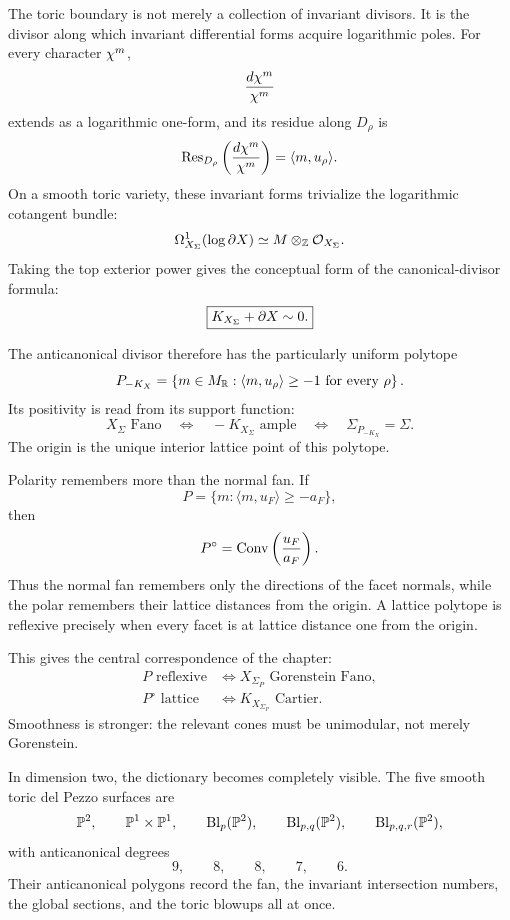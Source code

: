 The toric boundary is not merely a collection of invariant divisors.
It is the divisor along which invariant differential forms acquire
logarithmic poles. For every character \(\character{m}\),
\[
\frac{d\character{m}}{\character{m}}
\]
extends as a logarithmic one-form, and its residue along \(D_\rho\) is
\[
\operatorname{Res}_{D_\rho}
\left(\frac{d\character{m}}{\character{m}}\right)
=
\langle m,u_\rho\rangle.
\]
On a smooth toric variety, these invariant forms trivialize the
logarithmic cotangent bundle:
\[
\Omega^1_{X_\Sigma}(\log\boundaryX)
\simeq
M\otimes_{\ZZ}\mathcal O_{X_\Sigma}.
\]
Taking the top exterior power gives the conceptual form of the
canonical-divisor formula:
\[
\boxed{K_{X_\Sigma}+\boundaryX\sim0.}
\]

The anticanonical divisor therefore has the particularly uniform
polytope
\[
P_{-K_X}
=
\left\{
 m\in M_\RR:
 \langle m,u_\rho\rangle\geq-1
 \text{ for every }\rho
\right\}.
\]
Its positivity is read from its support function:
\[
X_\Sigma\text{ Fano}
\quad\Longleftrightarrow\quad
-K_{X_\Sigma}\text{ ample}
\quad\Longleftrightarrow\quad
\Sigma_{P_{-K_X}}=\Sigma.
\]
The origin is the unique interior lattice point of this polytope.

Polarity remembers more than the normal fan. If
\[
P=\{m:\langle m,u_F\rangle\geq-a_F\},
\]
then
\[
P^\circ
=
\Conv\left(\frac{u_F}{a_F}\right).
\]
Thus the normal fan remembers only the directions of the facet
normals, while the polar remembers their lattice distances from the
origin. A lattice polytope is reflexive precisely when every facet is
at lattice distance one from the origin.

This gives the central correspondence of the chapter:
\[
\boxed{
\begin{aligned}
P\text{ reflexive}
&\Longleftrightarrow
X_{\Sigma_P}\text{ Gorenstein Fano},\\
P^\circ\text{ lattice}
&\Longleftrightarrow
K_{X_{\Sigma_P}}\text{ Cartier}.
\end{aligned}}
\]
Smoothness is stronger: the relevant cones must be unimodular, not
merely Gorenstein.

In dimension two, the dictionary becomes completely visible. The five
smooth toric del Pezzo surfaces are
\[
\PP^2,
\qquad
\PP^1\times\PP^1,
\qquad
\Blp{\PP^2}{p},
\qquad
\Blp{\PP^2}{p,q},
\qquad
\Blp{\PP^2}{p,q,r},
\]
with anticanonical degrees
\[
9,\qquad8,\qquad8,\qquad7,\qquad6.
\]
Their anticanonical polygons record the fan, the invariant
intersection numbers, the global sections, and the toric blowups all
at once.

